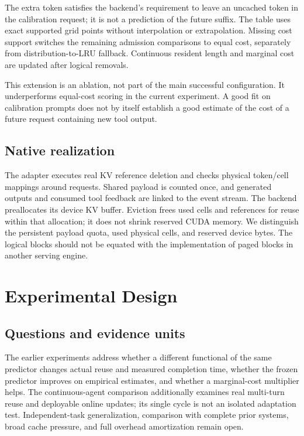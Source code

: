 \documentclass[sigconf, screen, review]{acmart}
\begin{document}
The extra token satisfies the backend's requirement to leave an uncached
token in the calibration request; it is not a prediction of the future
suffix. The table uses exact supported grid points without interpolation
or extrapolation. Missing cost support switches the remaining admission
comparisons to equal cost, separately from distribution-to-LRU fallback.
Continuous resident length and marginal cost are updated after logical
removals.

This extension is an ablation, not part of the main successful
configuration. It underperforms equal-cost scoring in the current
experiment. A good fit on calibration prompts does not by itself
establish a good estimate of the cost of a future request containing new
tool output.

\subsection{Native realization}\label{native-realization}

The adapter executes real KV reference deletion and checks physical
token/cell mappings around requests. Shared payload is counted once, and
generated outputs and consumed tool feedback are linked to the event
stream. The backend preallocates its device KV buffer. Eviction frees
used cells and references for reuse within that allocation; it does not
shrink reserved CUDA memory. We distinguish the persistent payload
quota, used physical cells, and reserved device bytes. The logical
blocks should not be equated with the implementation of paged blocks in
another serving engine.

\section{Experimental Design}\label{experimental-design}

\subsection{Questions and evidence
units}\label{questions-and-evidence-units}

The earlier experiments address whether a different functional of the
same predictor changes actual reuse and measured completion time,
whether the frozen predictor improves on empirical estimates, and
whether a marginal-cost multiplier helps. The continuous-agent
comparison additionally examines real multi-turn reuse and deployable
online updates; its single cycle is not an isolated adaptation test. Independent-task
generalization, comparison with complete prior systems, broad cache
pressure, and full overhead amortization remain open.
\end{document}
